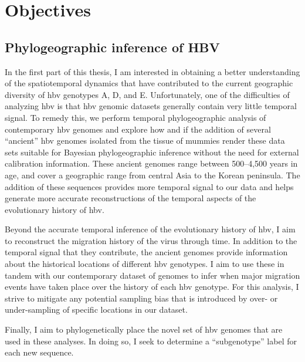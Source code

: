 \chapter{Objectives}
\label{ch:objectives}

\section{Phylogeographic inference of HBV}

In the first part of this thesis, I am interested in obtaining a better understanding of the spatiotemporal dynamics that have contributed to the current geographic diversity of \gls{hbv} genotypes A, D, and E.
Unfortunately, one of the difficulties of analyzing \gls{hbv} is that \gls{hbv} genomic datasets generally contain very little temporal signal.
To remedy this, we perform temporal phylogeographic analysis of contemporary \gls{hbv} genomes and explore how and if the addition of several ``ancient'' \gls{hbv} genomes isolated from the tissue of mummies \cite{muhlemann2018ancient, ross2018paradox} render these data sets suitable for Bayesian phylogeographic inference without the need for external calibration information.
These ancient genomes range between 500--4,500 years in age, and cover a geographic range from central Asia to the Korean peninsula.
The addition of these sequences provides more temporal signal to our data and helps generate more accurate reconstructions of the temporal aspects of the evolutionary history of \gls{hbv}.

Beyond the accurate temporal inference of the evolutionary history of \gls{hbv}, I aim to reconstruct the migration history of the virus through time.
In addition to the temporal signal that they contribute, the ancient genomes provide information about the historical locations of different \gls{hbv} genotypes.
I aim to use these in tandem with our contemporary dataset of genomes to infer when major migration events have taken place over the history of each \gls{hbv} genotype.
For this analysis, I strive to mitigate any potential sampling bias that is introduced by over- or under-sampling of specific locations in our dataset.

Finally, I aim to phylogenetically place the novel set of \gls{hbv} genomes that are used in these analyses.
In doing so, I seek to determine a ``subgenotype'' label for each new sequence. %


